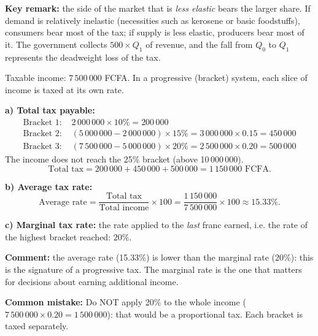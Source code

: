 \documentclass[11pt]{article}
\begin{document}
\begin{corrige}
\textbf{Key remark:} the side of the market that is \emph{less elastic} bears the larger share. If demand is relatively inelastic (necessities such as kerosene or basic foodstuffs), consumers bear most of the tax; if supply is less elastic, producers bear most of it. The government collects $500 \times Q_1$ of revenue, and the fall from $Q_0$ to $Q_1$ represents the deadweight loss of the tax.
\end{corrige}

\begin{corrige}
Taxable income: $7\,500\,000$ FCFA. In a progressive (bracket) system, each slice of income is taxed at its own rate.

\textbf{a) Total tax payable:}
\begin{align*}
\text{Bracket 1: } & 2\,000\,000 \times 10\% = 200\,000 \\
\text{Bracket 2: } & (5\,000\,000 - 2\,000\,000) \times 15\% = 3\,000\,000 \times 0.15 = 450\,000 \\
\text{Bracket 3: } & (7\,500\,000 - 5\,000\,000) \times 20\% = 2\,500\,000 \times 0.20 = 500\,000
\end{align*}
The income does not reach the 25\% bracket (above 10\,000\,000).
\[ \text{Total tax} = 200\,000 + 450\,000 + 500\,000 = \boxed{1\,150\,000 \text{ FCFA}}. \]

\textbf{b) Average tax rate:}
\[ \text{Average rate} = \frac{\text{Total tax}}{\text{Total income}} \times 100 = \frac{1\,150\,000}{7\,500\,000} \times 100 \approx 15.33\%. \]

\textbf{c) Marginal tax rate:} the rate applied to the \emph{last} franc earned, i.e. the rate of the highest bracket reached: $\boxed{20\%}$.

\textbf{Comment:} the average rate (15.33\%) is lower than the marginal rate (20\%): this is the signature of a progressive tax. The marginal rate is the one that matters for decisions about earning additional income.

\textbf{Common mistake:} Do NOT apply 20\% to the whole income ($7\,500\,000 \times 0.20 = 1\,500\,000$): that would be a proportional tax. Each bracket is taxed separately.
\end{corrige}
\end{document}
